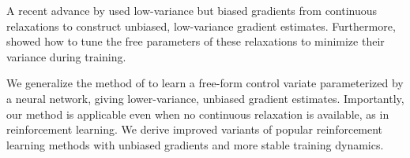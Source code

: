 \documentclass{article}
\begin{document}
A recent advance by \citet{tucker2017rebar} used low-variance but biased gradients from continuous relaxations to construct unbiased, low-variance gradient estimates.
Furthermore, \citet{tucker2017rebar} showed how to tune the free parameters of these relaxations to minimize their variance during training.

We generalize the method of \citet{tucker2017rebar} to learn a free-form control variate parameterized by a neural network, giving lower-variance, unbiased gradient estimates.
Importantly, our method is applicable even when no continuous relaxation is available, as in reinforcement learning.
We derive improved variants of popular reinforcement learning methods with unbiased gradients and more stable training dynamics.



\end{document}
